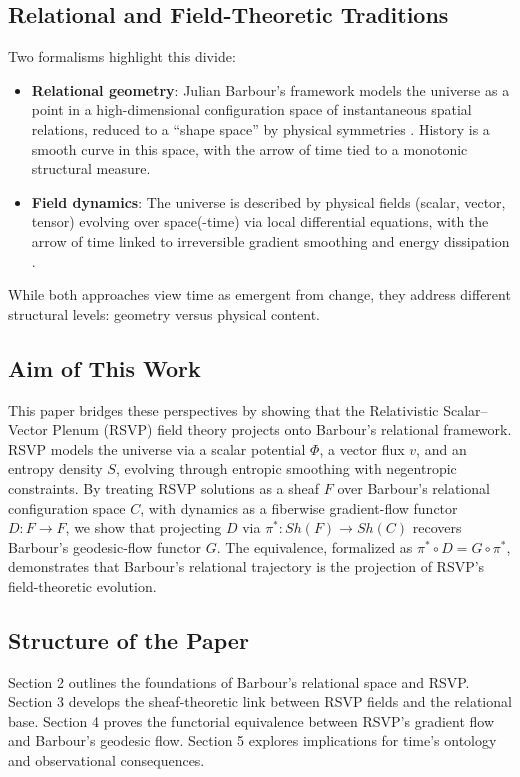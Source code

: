 \documentclass[11pt]{article}
\begin{document}
\subsection{Relational and Field-Theoretic Traditions}
Two formalisms highlight this divide:
\begin{itemize}
    \item \textbf{Relational geometry}: Julian Barbour’s framework models the universe as a point in a high-dimensional configuration space of instantaneous spatial relations, reduced to a “shape space” by physical symmetries \citep{Barbour1994}. History is a smooth curve in this space, with the arrow of time tied to a monotonic structural measure.
    \item \textbf{Field dynamics}: The universe is described by physical fields (scalar, vector, tensor) evolving over space(-time) via local differential equations, with the arrow of time linked to irreversible gradient smoothing and energy dissipation \citep{Rovelli2004}.
\end{itemize}
While both approaches view time as emergent from change, they address different structural levels: geometry versus physical content.

\subsection{Aim of This Work}
This paper bridges these perspectives by showing that the Relativistic Scalar–Vector Plenum (RSVP) field theory projects onto Barbour’s relational framework. RSVP models the universe via a scalar potential $\Phi$, a vector flux $v$, and an entropy density $S$, evolving through entropic smoothing with negentropic constraints. By treating RSVP solutions as a sheaf $F$ over Barbour’s relational configuration space $C$, with dynamics as a fiberwise gradient-flow functor $D: F \to F$, we show that projecting $D$ via $\pi^*: Sh(F) \to Sh(C)$ recovers Barbour’s geodesic-flow functor $G$. The equivalence, formalized as $\pi^* \circ D = G \circ \pi^*$, demonstrates that Barbour’s relational trajectory is the projection of RSVP’s field-theoretic evolution.

\subsection{Structure of the Paper}
Section 2 outlines the foundations of Barbour’s relational space and RSVP. Section 3 develops the sheaf-theoretic link between RSVP fields and the relational base. Section 4 proves the functorial equivalence between RSVP’s gradient flow and Barbour’s geodesic flow. Section 5 explores implications for time’s ontology and observational consequences.
\end{document}
